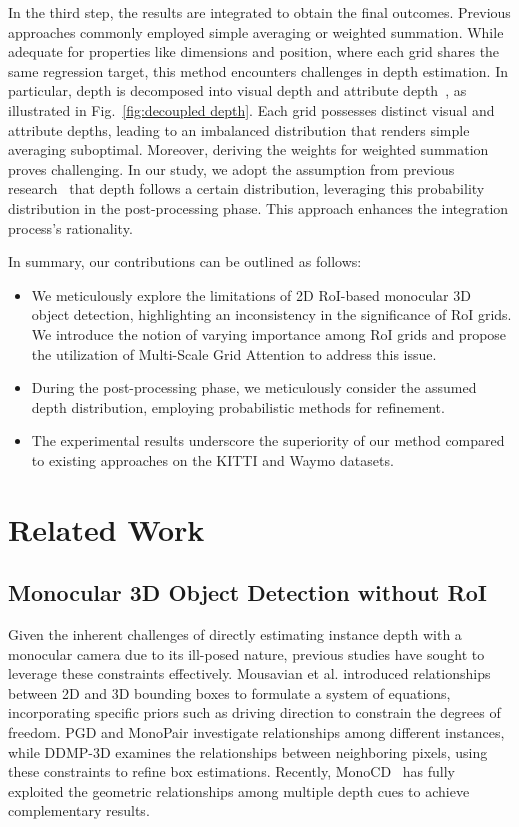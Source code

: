 \documentclass[journal]{IEEEtran}
\begin{document}
	In the third step, the results are integrated to obtain the final outcomes. Previous approaches commonly employed simple averaging or weighted summation. While adequate for properties like dimensions and position, where each grid shares the same regression target, this method encounters challenges in depth estimation. In particular, depth is decomposed into visual depth and attribute depth~\cite{didm3d}, as illustrated in Fig.~\ref{fig:decoupled depth}. Each grid possesses distinct visual and attribute depths, leading to an imbalanced distribution that renders simple averaging suboptimal. Moreover, deriving the weights for weighted summation proves challenging. In our study, we adopt the assumption from previous research~\cite{gupnet, didm3d} that depth follows a certain distribution, leveraging this probability distribution in the post-processing phase. This approach enhances the integration process's rationality.
	
	
	In summary, our contributions can be outlined as follows:
	\begin{itemize}
		\item We meticulously explore the limitations of 2D RoI-based monocular 3D object detection, highlighting an inconsistency in the significance of RoI grids. We introduce the notion of varying importance among RoI grids and propose the utilization of Multi-Scale Grid Attention to address this issue.
		\item During the post-processing phase, we meticulously consider the assumed depth distribution, employing probabilistic methods for refinement.
		\item The experimental results underscore the superiority of our method compared to existing approaches on the KITTI and Waymo datasets.
	\end{itemize}
	
	\section{Related Work}
	\subsection{Monocular 3D Object Detection without RoI}
	Given the inherent challenges of directly estimating instance depth with a monocular camera due to its ill-posed nature, previous studies have sought to leverage these constraints effectively. Mousavian et al. \cite{geometry3d} introduced relationships between 2D and 3D bounding boxes to formulate a system of equations, incorporating specific priors such as driving direction to constrain the degrees of freedom. PGD \cite{pgd} and MonoPair \cite{monopair} investigate relationships among different instances, while DDMP-3D \cite{ddmp-3d} examines the relationships between neighboring pixels, using these constraints to refine box estimations. Recently, MonoCD~\cite{monocd} has fully exploited the geometric relationships among multiple depth cues to achieve complementary results.
	
\end{document}
